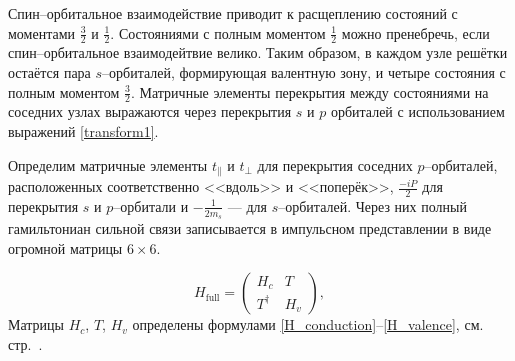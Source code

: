Спин--орбитальное взаимодействие приводит к расщеплению состояний с моментами $\frac32$ и
$\frac12$.
Состояниями с полным моментом $\frac{1}{2}$ 
можно пренебречь, если спин--орбитальное взаимодейтвие велико. Таким образом, в каждом
узле решётки остаётся пара $s$--орбиталей, формирующая валентную зону, и четыре состояния
с полным моментом $\frac{3}{2}$. Матричные элементы перекрытия между состояниями на соседних
узлах выражаются через перекрытия $s$ и $p$ орбиталей с использованием выражений 
\eqref{transform1}. 

Определим матричные элементы $t_\parallel$ и $t_\perp$ для перекрытия соседних $p$--орбиталей,
расположенных соответственно <<вдоль>> и <<поперёк>>, $\frac{-iP}{2}$ для перекрытия
$s$ и $p$--орбитали и $-\frac{1}{2m_s}$ --- для $s$--орбиталей. Через них полный гамильтониан
сильной связи записывается в импульсном представлении в виде огромной матрицы $6\times6$. 

\begin{equation}
    \label{hfull}
    H_{\mathrm{full}} = \begin{pmatrix}
                            H_c & T \\
                            T^\dagger & H_v
                        \end{pmatrix},
\end{equation}
Матрицы $H_c$, $T$, $H_v$ определены формулами \eqref{H_conduction}--\eqref{H_valence}, см.
стр.~\pageref{H_conduction}.

